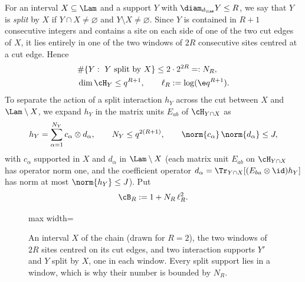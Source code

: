 \precisely
For an interval $X\subseteq\Lam$ and a support $Y$ with
$\diam_{d_\Lam}Y\le R$, we say that $Y$ is \emph{split} by $X$ if
$Y\cap X\ne\varnothing$ and $Y\setminus X\ne\varnothing$. Since $Y$ is
contained in $R+1$ consecutive integers and contains a site on each
side of one of the two cut edges of $X$, it lies entirely in one of the
two windows of $2R$ consecutive sites centred at a cut edge. Hence
\begin{equation}\label{eq:count}
\begin{split}
 &\#\{Y:\ Y\text{ split by }X\}\le 2\cdot 2^{2R}=:N_R,\\
 &\dim\cH_Y\le q^{R+1},\qquad
 \ell_R:=\log(\e q^{R+1}).
\end{split}
\end{equation}
To separate the action of a split interaction $h_Y$ across the cut between
$X$ and $\Lam\setminus X$, we expand $h_Y$ in the matrix units $E_{ab}$ of
$\cH_{Y\cap X}$ as
\begin{equation}\label{eq:matrixunits}
 h_Y=\sum_{\alpha=1}^{N_Y}c_\alpha\otimes d_\alpha,\qquad
 N_Y\le q^{2(R+1)},\qquad \norm{c_\alpha}\,\norm{d_\alpha}\le J,
\end{equation}
with $c_\alpha$ supported in $X$ and $d_\alpha$ in $\Lam\setminus X$
(each matrix unit $E_{ab}$ on $\cH_{Y\cap X}$ has operator norm one, and
the coefficient operator $d_\alpha=\Tr_{Y\cap X}[(E_{ba}\otimes\id)h_Y]$
has norm at most $\norm{h_Y}\le J$). Put
\begin{equation}\label{eq:BR}
 \cB_R:=1+N_R\,\ell_R^2 .
\end{equation}

\begin{figure}[t]
\centering
\begin{adjustbox}{max width=\linewidth}

\end{adjustbox}
\caption{An interval $X$ of the chain (drawn for $R=2$), the two windows of $2R$ sites centred on its cut edges, and two interaction supports $Y'$ and $Y$ split by $X$, one in each window. Every split support lies in a window, which is why their number is bounded by $N_R$.}\label{fig:chain-cuts}
\end{figure}

